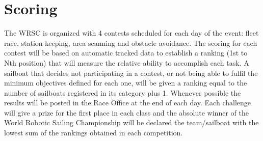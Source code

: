 \documentclass[12pt]{article}
\begin{document}
\section{Scoring}

The WRSC is organized with 4 contests scheduled for each day of the event: fleet
race, station
keeping, area scanning and obstacle avoidance. The scoring for each contest will
be based on
automatic tracked data to establish a ranking (1st to Nth position) that will
measure the relative
ability to accomplish each task. A sailboat that decides not participating in a
contest, or not
being able to fulfil the minimum objectives defined for each one, will be given
a ranking equal
to the number of sailboats registered in its category plus 1. Whenever possible
the results will
be posted in the Race Office at the end of each day.
Each challenge will give a prize for the first place in each class and the
absolute winner of the World Robotic Sailing Championship will be declared the
team/sailboat with the lowest sum of
the rankings obtained in each competition.
\end{document}
